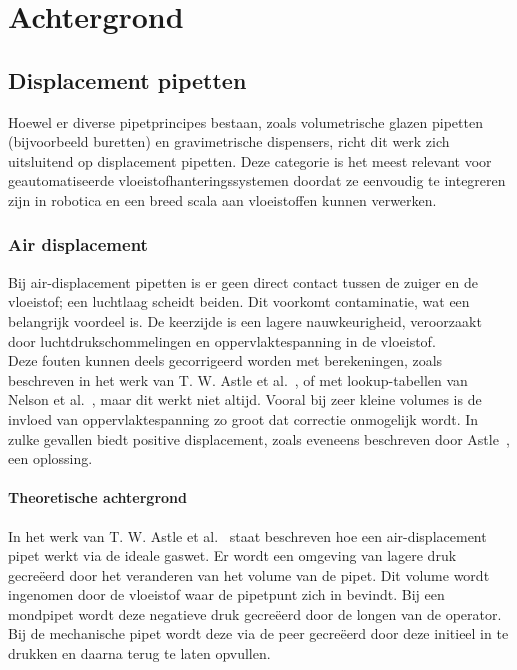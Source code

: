 \chapter{Achtergrond}

\section{Displacement pipetten}
Hoewel er diverse pipetprincipes bestaan, zoals volumetrische glazen pipetten (bijvoorbeeld buretten) en gravimetrische dispensers, richt dit werk zich uitsluitend op displacement pipetten. Deze categorie is het meest relevant voor geautomatiseerde vloeistofhanteringssystemen doordat ze eenvoudig te integreren zijn in robotica en een breed scala aan vloeistoffen kunnen verwerken.

\subsection{Air displacement}
Bij air-displacement pipetten is er geen direct contact tussen de zuiger en de vloeistof; een luchtlaag scheidt beiden. Dit voorkomt contaminatie, wat een belangrijk voordeel is. De keerzijde is een lagere nauwkeurigheid, veroorzaakt door luchtdrukschommelingen en oppervlaktespanning in de vloeistof.
\\[12pt]Deze fouten kunnen deels gecorrigeerd worden met berekeningen, zoals beschreven in het werk van T. W. Astle et al.\ \cite{RN15}, of met lookup-tabellen van Nelson et al.\ \cite{RN35}, maar dit werkt niet altijd. Vooral bij zeer kleine volumes is de invloed van oppervlaktespanning zo groot dat correctie onmogelijk wordt. In zulke gevallen biedt positive displacement, zoals eveneens beschreven door Astle\ \cite{RN15}, een oplossing.

\subsubsection{Theoretische achtergrond}
In het werk van T. W. Astle et al.\ \cite{RN15} staat beschreven hoe een air-displacement pipet werkt via de ideale gaswet. Er wordt een omgeving van lagere druk gecreëerd door het veranderen van het volume van de pipet. Dit volume wordt ingenomen door de vloeistof waar de pipetpunt zich in bevindt. Bij een mondpipet wordt deze negatieve druk gecreëerd door de longen van de operator. Bij de mechanische pipet wordt deze via de peer gecreëerd door deze initieel in te drukken en daarna terug te laten opvullen.

